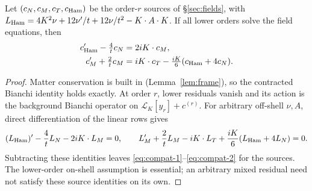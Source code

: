 \begin{proposition}\label{prop:compat}
Let $(c_N,c_M,c_T,c_{\rm Ham})$ be the order-$r$ sources of \S\ref{sec:fields}, with
$L_{\rm Ham}=4K^2\nu+12\nu'/t+12\nu/t^2-K\cdot A\cdot K$.
If all lower orders solve the field equations, then
\begin{align}
 c_{\rm Ham}'-\tfrac4tc_N&=2iK\cdot c_M,\label{eq:compat-1}\\
 c_M'+\tfrac2tc_M&=iK\cdot c_T-\tfrac{iK}6(c_{\rm Ham}+4c_N).\label{eq:compat-2}
\end{align}
\end{proposition}
\begin{proof}
Matter conservation is built in (Lemma~\ref{lem:frame}), so the contracted Bianchi
identity holds exactly. At order $r$, lower residuals vanish and its action is the
background Bianchi operator on $\mathcal L_K[y_r]+c^{(r)}$.
For arbitrary off-shell $\nu,A$, direct differentiation of the linear rows gives
\[
 (L_{\rm Ham})'-\frac4tL_N-2iK\cdot L_M=0,\qquad
 L_M'+\frac2tL_M-iK\cdot L_T+\frac{iK}{6}(L_{\rm Ham}+4L_N)=0.
\]
Subtracting these identities leaves \eqref{eq:compat-1}--\eqref{eq:compat-2} for the sources.
The lower-order on-shell assumption is essential; an arbitrary mixed residual need not
satisfy these source identities on its own.
\end{proof}

